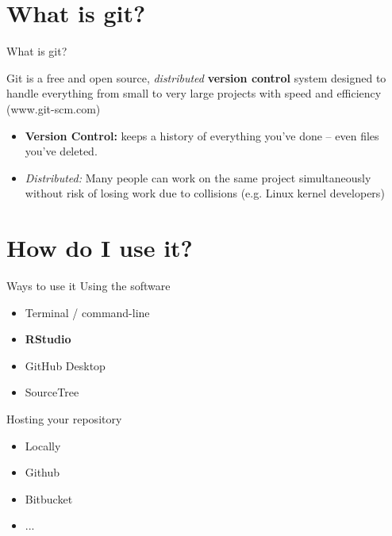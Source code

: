 \documentclass{beamer}
\begin{document}
\section{What is git?}

\begin{frame}{What is git?}

  Git is a free and open source, {\it distributed} {\bf version
    control} system designed to handle everything from small to very
  large projects with speed and efficiency (www.git-scm.com)
  \vspace{2em}
  \begin{itemize}
  \item {\bf Version Control:} keeps a history of everything you've
    done -- even files you've deleted.
  \item {\it Distributed:} Many people can work on the same project
    simultaneously without risk of losing work due to collisions
    (e.g. Linux kernel developers)
  \end{itemize}
\end{frame}

\section{How do I use it?}

\begin{frame}{Ways to use it}
    Using the software
    \begin{itemize}
        \item Terminal / command-line
        \item \textbf{RStudio}
        \item GitHub Desktop
        \item SourceTree
    \end{itemize}
    Hosting your repository
    \begin{itemize}
        \item Locally
        \item Github
        \item Bitbucket
        \item ...
    \end{itemize}
\end{frame}
\end{document}
